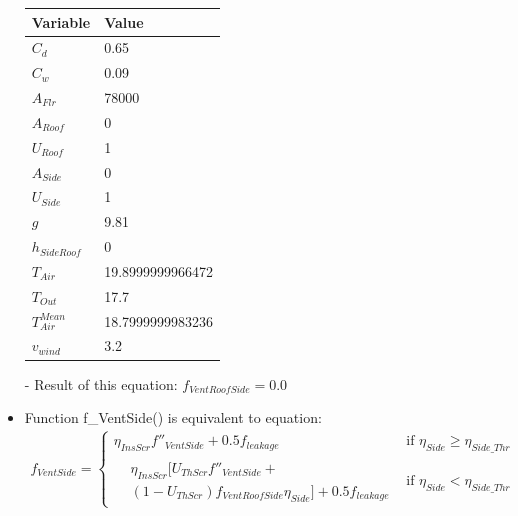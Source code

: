 \documentclass[a4paper]{article}
\begin{document}
\begin{itemize}
        \begin{table}[H]
          \centering
          \begin{tabular}{|l|l|}
            \hline
            \textbf{Variable}  & \textbf{Value}   \\ \hline
            \(C_d\)            & 0.65             \\ \hline
            \(C_w\)            & 0.09             \\ \hline
            \(A_{Flr}\)        & 78000            \\ \hline
            \(A_{Roof}\)       & 0                \\ \hline
            \(U_{Roof}\)       & 1                \\ \hline
            \(A_{Side}\)       & 0                \\ \hline
            \(U_{Side}\)       & 1                \\ \hline
            \(g\)              & 9.81             \\ \hline
            \(h_{SideRoof}\)   & 0                \\ \hline
            \(T_{Air}\)        & 19.8999999966472 \\ \hline
            \(T_{Out}\)        & 17.7             \\ \hline
            \(T_{Air}^{Mean}\) & 18.7999999983236 \\ \hline
            \(v_{wind}\)       & 3.2              \\ \hline
          \end{tabular}
        \end{table}

  \item[-] Result of this equation: \(f_{VentRoofSide} = 0.0\)

  \item Function f\_VentSide() is equivalent to equation:
        \begin{gather*}
          f_{VentSide} =
          \begin{cases}
            \eta_{InsScr} f''_{VentSide} + 0.5f_{leakage} & \text{if~} \eta_{Side} \geq \eta_{Side\_Thr} \\
            \begin{split}
              & \eta_{InsScr} [U_{ThScr}f''_{VentSide} + \\
              & (1-U_{ThScr})f_{VentRoofSide} \eta_{Side}] + 0.5 f_{leakage}
            \end{split}                   & \text{if~} \eta_{Side} < \eta_{Side\_Thr}
          \end{cases}
        \end{gather*}


\end{itemize}
\end{document}
